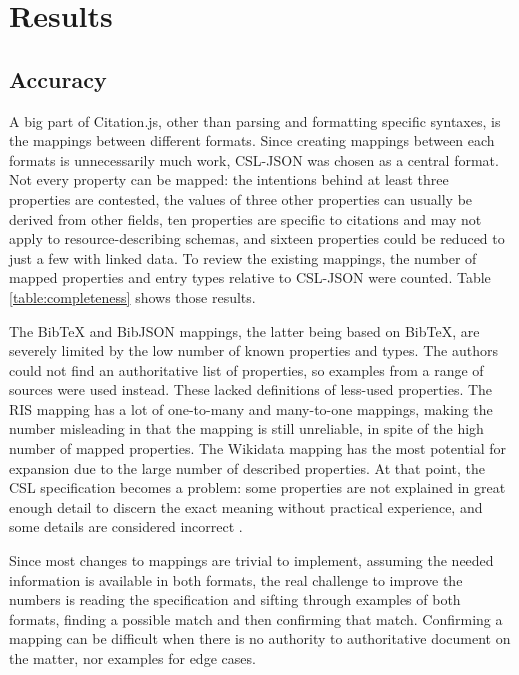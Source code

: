 \documentclass[fleqn,10pt,lineno]{wlpeerj} %
\begin{document}
\section*{Results}

\subsection*{Accuracy}

A big part of Citation.js, other than parsing and formatting specific syntaxes, is the mappings between different formats. Since creating mappings between each formats is unnecessarily much work, CSL-JSON was chosen as a central format. Not every property can be mapped: the intentions behind at least three properties are contested, the values of three other properties can usually be derived from other fields, ten properties are specific to citations and may not apply to resource-describing schemas, and sixteen properties could be reduced to just a few with linked data. To review the existing mappings, the number of mapped properties and entry types relative to CSL-JSON were counted. Table \ref{table:completeness} shows those results.

The BibTeX and BibJSON mappings, the latter being based on BibTeX, are severely limited by the low number of known properties and types. The authors could not find an authoritative list of properties, so examples from a range of sources were used instead. These lacked definitions of less-used properties. The RIS mapping has a lot of one-to-many and many-to-one mappings, making the number misleading in that the mapping is still unreliable, in spite of the high number of mapped properties. The Wikidata mapping has the most potential for expansion due to the large number of described properties. At that point, the CSL specification becomes a problem: some properties are not explained in great enough detail to discern the exact meaning without practical experience, and some details are considered incorrect \cite{wiernik_inconsistencies_2018}.

Since most changes to mappings are trivial to implement, assuming the needed information is available in both formats, the real challenge to improve the numbers is reading the specification and sifting through examples of both formats, finding a possible match and then confirming that match. Confirming a mapping can be difficult when there is no authority to authoritative document on the matter, nor examples for edge cases.
\end{document}
